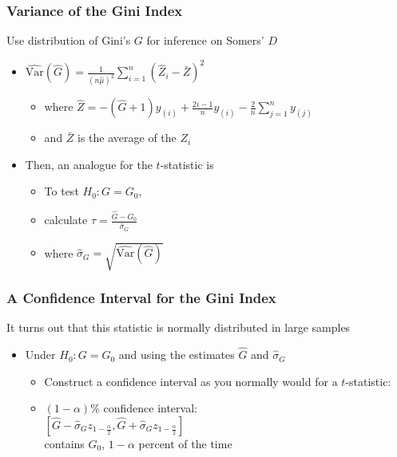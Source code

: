 \documentclass{beamer}
\begin{document}
\begin{frame}
\frametitle{Variance of the Gini Index}

Use distribution of Gini's $G$ for inference on Somers' $D$
\begin{itemize}
    \item $\hat{\mathrm{Var}}(\hat{G}) = \frac{1}{(n\hat{\mu})^2} \sum_{i = 1}^{n}(\hat{Z}_i - \bar{Z})^2$
    \begin{itemize}
        \item where $\hat{Z} = - (\hat{G} + 1) y_{(i)} + \frac{2i - 1}{n} y_{(i)} - \frac{2}{n} \sum_{j = 1}^{n} y_{(j)}$
        \item and $\bar{Z}$ is the average of the $Z_i$
    \end{itemize}
    \item Then, an analogue for the $t$-statistic is
    \begin{itemize}
        \item To test $H_0: G = G_0$,
        \item calculate $\tau = \frac{\hat{G} - G_0}{\hat{\sigma}_G}$
        \item where $\hat{\sigma}_G = \sqrt{\hat{\mathrm{Var}}(\hat{G})}$
    \end{itemize}
\end{itemize}

\end{frame}


\begin{frame}
\frametitle{A Confidence Interval for the Gini Index}

It turns out that this statistic is normally distributed in large samples
\begin{itemize}
    \item Under $H_0: G = G_0$ and using the estimates $\hat{G}$ and $\hat{\sigma}_G$
    \begin{itemize}
        \item Construct a confidence interval as you normally would for a $t$-statistic:
        \item $(1 - \alpha)$\% confidence interval: \\
            $\left[ \hat{G} - \hat{\sigma}_G z_{1 - \frac{\alpha}{2}}, \hat{G} + \hat{\sigma}_G z_{1 - \frac{\alpha}{2}} \right]$ \\
            contains $G_0$, $1 - \alpha$ percent of the time
    \end{itemize}
\end{itemize}

\end{frame}
\end{document}
